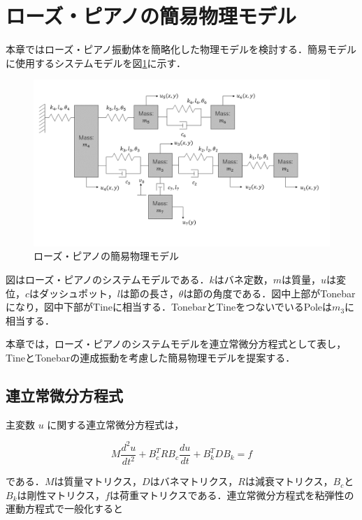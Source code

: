 \section{ローズ・ピアノの簡易物理モデル}

本章ではローズ・ピアノ振動体を簡略化した物理モデルを検討する．簡易モデルに使用するシステムモデルを図\ref{fig:簡易モデル}に示す．

\begin{figure}
    \centering
    \includegraphics[width=15cm]{img/system-model.png}
    \caption{ローズ・ピアノの簡易物理モデル}
    \label{fig:簡易モデル}
\end{figure}


図はローズ・ピアノのシステムモデルである．$k$はバネ定数，$m$は質量，$u$は変位，$c$はダッシュポット，$l$は節の長さ，$\theta$は節の角度である．図中上部がTonebarになり，図中下部がTineに相当する．TonebarとTineをつないでいるPoleは$m_3$に相当する．

本章では，ローズ・ピアノのシステムモデルを連立常微分方程式として表し，TineとTonebarの連成振動を考慮した簡易物理モデルを提案する．



\subsection{連立常微分方程式}

主変数 $u$ に関する連立常微分方程式は，

\begin{equation}
    M \frac{d^2 u}{dt^2} + B_c^T R B_c \frac{du}{dt} + B_k^T D B_k = f    
\end{equation}

である．$M$は質量マトリクス，$D$はバネマトリクス，$R$は減衰マトリクス，$B_c$と$B_k$は剛性マトリクス，$f$は荷重マトリクスである．連立常微分方程式を粘弾性の運動方程式で一般化すると


